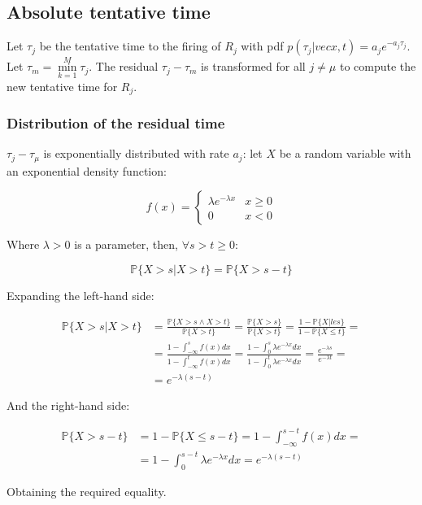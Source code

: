   \subsection{Absolute tentative time}
  Let $\tau_j$ be the tentative time to the firing of $R_j$ with pdf $p(\tau_j|vec{x},t) = a_je^{-a_j\tau_j}$.
  Let $\tau_m = \min\limits_{k=1}^M\tau_j$.
  The residual $\tau_j-\tau_m$ is transformed for all $j\neq\mu$ to compute the new tentative time for $R_j$.

    \subsubsection{Distribution of the residual time}
    $\tau_j-\tau_\mu$ is exponentially distributed with rate $a_j$: let $X$ be a random variable with an exponential density function:

    $$f(x) = \begin{cases}\lambda e^{-\lambda x} & x\ge 0\\ 0 &x < 0\end{cases}$$

    Where $\lambda>0$ is a parameter, then, $\forall s >t\ge 0$:

    $$\mathbb{P}\{X>s|X>t\} = \mathbb{P}\{X>s-t\}$$

    Expanding the left-hand side:

    \begin{align*}
      \mathbb{P}\{X>s|X>t\} &= \frac{\mathbb{P}\{X>s\land X>t\}}{\mathbb{P}\{X>t\}} = \frac{\mathbb{P}\{X>s\}}{\mathbb{P}\{X>t\}} = \frac{1-\mathbb{P}\{X|le s\}}{1-\mathbb{P}\{X\le t\}} =\\
                            &=\frac{1-\int_{-\infty}^sf(x)dx}{1-\int_{-\infty}^tf(x)dx} = \frac{1-\int_0^s\lambda e^{-\lambda x}dx}{1-\int_0^t\lambda e^{-\lambda x}dx} = \frac{e^{-\lambda s}}{e^{-\lambda t}}=\\
                            &=e^{-\lambda(s-t)}
    \end{align*}

    And the right-hand side:


    \begin{align*}
      \mathbb{P}\{X>s-t\} &= 1-\mathbb{P}\{X\le s-t\} = 1-\int_{-\infty}^{s-t}f(x)dx =\\
                          &= 1-\int_{0}^{s-t}\lambda e^{-\lambda x}dx = e^{-\lambda(s-t)}
    \end{align*}

    Obtaining the required equality.

